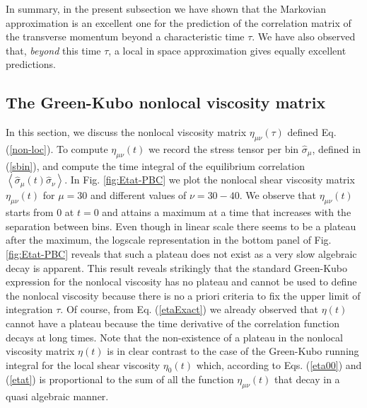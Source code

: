 \documentclass[b5paper,openright,11pt]{book}
\newcommand{\llangle}{\left\langle}
\newcommand{\rrangle}{\right\rangle}
\begin{document}
In summary, in the present subsection we have shown that the Markovian
approximation  is  an   excellent  one  for  the   prediction  of  the
correlation matrix of the  transverse momentum beyond a characteristic
time $\tau$.   We have also  observed that, \textit{beyond}  this time
$\tau$,  a  local  in  space  approximation  gives  equally  excellent
predictions.




\subsection{The Green-Kubo nonlocal viscosity matrix}
In   this  section,   we  discuss   the  nonlocal   viscosity  matrix
$\eta_{\mu\nu}(\tau)$  defined   Eq.   (\ref{non-loc}).    To  compute
$\eta_{\mu\nu}(t)$   we    record   the   stress   tensor    per   bin
$\hat{\sigma}_\mu$,  defined in  (\ref{sbin}),  and  compute the  time
integral     of     the      equilibrium     correlation     $\llangle
\hat{\sigma}_{\mu}(t)\hat{\sigma}_\nu\rrangle$.         In        Fig.
\ref{fig:Etat-PBC}  we  plot  the nonlocal  shear  viscosity
matrix  $\eta_{\mu\nu}(t)$  for  $\mu=30$   and  different  values  of
$\nu=30-40$.   We observe  that  $\eta_{\mu\nu}(t)$ starts  from 0  at
$t=0$  and  attains a  maximum  at  a  time  that increases  with  the
separation between bins. Even though in linear scale there seems to be
a plateau after the maximum, the logscale representation in the bottom
panel of Fig.  \ref{fig:Etat-PBC} reveals that such a plateau
does  not exist  as a  very slow  algebraic decay  is apparent.   This
result reveals strikingly that  the standard Green-Kubo expression for
the nonlocal  viscosity has no plateau  and cannot be used  to define
the nonlocal viscosity  because there is no a priori  criteria to fix
the  upper  limit   of  integration  $\tau$.   Of   course,  from  Eq.
(\ref{etaExact})  we already  observed  that $\eta(t)$  cannot have  a
plateau because the time derivative of the correlation function decays
at  long times.   Note  that the  non-existence of  a  plateau in  the
nonlocal viscosity matrix $\eta(t)$ is  in clear contrast to the case
of  the Green-Kubo  running  integral for  the  local shear  viscosity
$\eta_0(t)$ which,  according to Eqs.  (\ref{eta00})  and (\ref{etat})
is proportional to the sum of all the function $\eta_{\mu\nu}(t)$ that
decay  in a  quasi  algebraic  manner. 
\end{document}
